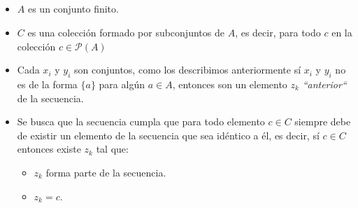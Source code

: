 \documentclass[spanish, xcolor=dvipsnames, aspectratio=169]{beamer}
\newcommand{\subsectiontitle}{}
\begin{document}
\subsection{\subsectiontitle}
\begin{frame}{\subsectiontitle}
\begin{itemize}
    \item $A$ es un conjunto finito.
    \item $C$ es una colección formado por subconjuntos de $A$, es decir, para todo \(c\) en la colección 
          \(c \in \mathcal{P}\left(A\right)\)
    \item Cada $x_{i}$ y $y_{i}$ son conjuntos, como los describimos anteriormente sí $x_{i}$ y $y_{i}$ no es de la forma $\{ a \}$ para algún $a \in A$, entonces son un elemento $z_{k}$ \textit{``anterior``} de la secuencia.
    \item Se busca que la secuencia cumpla que para todo elemento $c \in C$ siempre debe de existir un elemento de la secuencia que sea idéntico a él, es decir, sí $c \in C$ entonces existe $z_{k}$ tal que:
    \begin{itemize}
        \item $z_{k}$ forma parte de la secuencia.
        \item $z_{k} = c$.
    \end{itemize}
\end{itemize}
\end{frame}
\renewcommand{\subsectiontitle}{Ejemplo}
\end{document}
